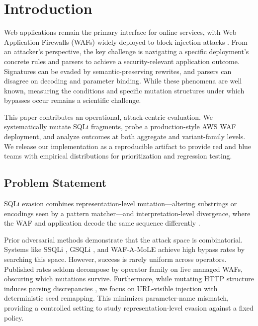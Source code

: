 \section{Introduction}
Web applications remain the primary interface for online services, with Web Application Firewalls (WAFs) widely deployed to block injection attacks \cite{owasp-crs}. From an attacker's perspective, the key challenge is navigating a specific deployment's concrete rules and parsers to achieve a security-relevant application outcome. Signatures can be evaded by semantic-preserving rewrites, and parsers can disagree on decoding and parameter binding. While these phenomena are well known, measuring the conditions and specific mutation structures under which bypasses occur remains a scientific challenge.

This paper contributes an operational, attack-centric evaluation. We systematically mutate SQLi fragments, probe a production-style AWS WAF deployment, and analyze outcomes at both aggregate and variant-family levels. We release our implementation as a reproducible artifact to provide red and blue teams with empirical distributions for prioritization and regression testing.

\subsection{Problem Statement}
SQLi evasion combines representation-level mutation---altering substrings or encodings seen by a pattern matcher---and interpretation-level divergence, where the WAF and application decode the same sequence differently \cite{akhavani2025waffled}. 

Prior adversarial methods demonstrate that the attack space is combinatorial. Systems like SSQLi \cite{guan2023ssqli}, GSQLi \cite{khan2024gsqli}, and WAF-A-MoLE \cite{demetrio2020wafamole} achieve high bypass rates by searching this space. However, success is rarely uniform across operators. Published rates seldom decompose by operator family on live managed WAFs, obscuring which mutations survive. Furthermore, while mutating HTTP structure induces parsing discrepancies \cite{akhavani2025waffled}, we focus on URL-visible injection with deterministic seed remapping. This minimizes parameter-name mismatch, providing a controlled setting to study representation-level evasion against a fixed policy.

